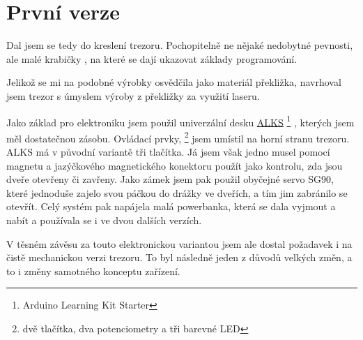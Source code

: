 \section{První verze}

Dal jsem se tedy do kreslení trezoru. Pochopitelně ne nějaké nedobytné pevnosti, ale malé
krabičky \parencite{128x128mm}, na které se dají ukazovat základy programování. 

Jelikož se mi na podobné výrobky osvědčila jako materiál překližka, navrhoval jsem trezor s úmyslem výroby z překližky za využití laseru. 

Jako základ pro elektroniku  jsem použil univerzální 
desku \href{https://github.com/RoboticsBrno/ArduinoLearningKitStarter}{ALKS} \footnote{Arduino Learning Kit Starter} \parencite{ALKS}, 
kterých jsem měl dostatečnou zásobu. Ovládací prvky, \footnote{dvě tlačítka, dva potenciometry a tři barevné LED} jsem umístil na horní stranu trezoru. 
ALKS má v původní variantě tři tlačítka. Já jsem však jedno musel pomocí magnetu a jazýčkového magnetického konektoru použít
jako kontrolu, zda jsou dveře otevřeny či zavřeny. Jako zámek jsem pak použil obyčejné servo
SG90, které jednoduše zajelo svou páčkou do drážky ve dveřích, a tím jim zabránilo 
se otevřít. Celý systém pak napájela malá powerbanka, která se dala vyjmout a nabít  
a používala se i ve dvou dalších verzích.


V těsném závěsu za touto elektronickou variantou jsem ale dostal požadavek i na čistě mechanickou verzi trezoru. 
To byl následně jeden z důvodů velkých změn, a to i změny samotného konceptu zařízení.

\newpage